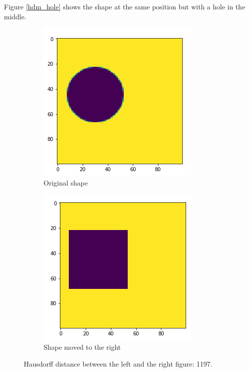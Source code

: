 Figure \ref{hdm_hole} shows the shape at the same position but with a hole in the middle.

\begin{figure}[H]
    \centering
    \begin{subfigure}{.5\textwidth}
        \centering
        \includegraphics[width=.75\linewidth]{chapters/06_hdm/images/hdm_original.png}
        \caption{Original shape}
    \end{subfigure}%
    \begin{subfigure}{.5\textwidth}
        \centering
        \includegraphics[width=.75\linewidth]{chapters/06_hdm/images/hdm_square.png}
        \caption{Shape moved to the right}
    \end{subfigure}
    \caption{Hausdorff distance between the left and the right figure: 1197. }
    \label{hdm_square}
\end{figure}

